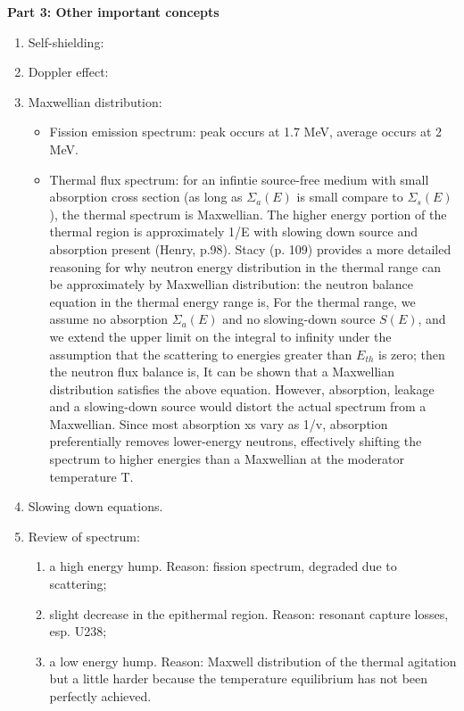 \documentclass{school-22.211-notes}
\begin{document}
\textbf{Part 3: Other important concepts}
\begin{enumerate}
\item Self-shielding:
\item Doppler effect:
\item Maxwellian distribution: 
  \begin{itemize}
  \item Fission emission spectrum: peak occurs at 1.7 MeV, average occurs at 2 MeV.
  \item Thermal flux spectrum: for an infintie source-free medium with small absorption cross section (as long as $\Sigma_a(E)$ is small compare to $\Sigma_s(E)$), the thermal spectrum is Maxwellian. The higher energy portion of the thermal region is approximately 1/E with slowing down source and absorption present (Henry, p.98). Stacy (p. 109) provides a more detailed reasoning for why neutron energy distribution in the thermal range can be approximately by Maxwellian distribution: the neutron balance equation in the thermal energy range is, 
    For the thermal range, we assume no absorption $\Sigma_a(E)$ and no slowing-down source $S(E)$, and we extend the upper limit on the integral to infinity under the assumption that the scattering to energies greater than $E_{th}$ is zero; then the neutron flux balance is,
   It can be shown that a Maxwellian distribution satisfies the above equation. However, absorption, leakage and a slowing-down source would distort the actual spectrum from a Maxwellian. Since most absorption xs vary as 1/v, absorption preferentially removes lower-energy neutrons, effectively shifting the spectrum to higher energies than a Maxwellian at the moderator temperature T. 
  \end{itemize}
\item Slowing down equations. 
\item Review of spectrum:
    \begin{enumerate}
      \item a high energy hump. Reason: fission spectrum, degraded due to scattering; 
      \item slight decrease in the epithermal region. Reason: resonant capture losses, esp. U238; 
      \item  a low energy hump. Reason: Maxwell distribution of the thermal agitation but a little harder because the temperature equilibrium has not been perfectly achieved. 

\end{enumerate}
\end{enumerate}
\end{document}
